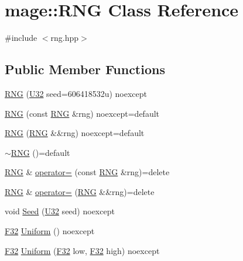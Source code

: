 \hypertarget{classmage_1_1_r_n_g}{}\section{mage\+:\+:R\+NG Class Reference}
\label{classmage_1_1_r_n_g}


{\ttfamily \#include $<$rng.\+hpp$>$}

\subsection*{Public Member Functions}
\begin{DoxyCompactItemize}
\item 
\mbox{\hyperlink{classmage_1_1_r_n_g_aa428fa24cbe52d5819bd6e8d6abd362a}{R\+NG}} (\mbox{\hyperlink{namespacemage_aa5d6eaabaac3cdd01873d6a3d27e90f3}{U32}} seed=606418532u) noexcept
\item 
\mbox{\hyperlink{classmage_1_1_r_n_g_a7a215b676b1192d312393e1bd136eb54}{R\+NG}} (const \mbox{\hyperlink{classmage_1_1_r_n_g}{R\+NG}} \&rng) noexcept=default
\item 
\mbox{\hyperlink{classmage_1_1_r_n_g_a6df36809ab6b982ee21d1987b6e9a693}{R\+NG}} (\mbox{\hyperlink{classmage_1_1_r_n_g}{R\+NG}} \&\&rng) noexcept=default
\item 
\mbox{\hyperlink{classmage_1_1_r_n_g_a20d24aabf31837e48a38b9ca221b0a9b}{$\sim$\+R\+NG}} ()=default
\item 
\mbox{\hyperlink{classmage_1_1_r_n_g}{R\+NG}} \& \mbox{\hyperlink{classmage_1_1_r_n_g_a38a0a4296338162fe105012cb4d13318}{operator=}} (const \mbox{\hyperlink{classmage_1_1_r_n_g}{R\+NG}} \&rng)=delete
\item 
\mbox{\hyperlink{classmage_1_1_r_n_g}{R\+NG}} \& \mbox{\hyperlink{classmage_1_1_r_n_g_ac9155db13a3d4b7f44a4f800085197a2}{operator=}} (\mbox{\hyperlink{classmage_1_1_r_n_g}{R\+NG}} \&\&rng)=delete
\item 
void \mbox{\hyperlink{classmage_1_1_r_n_g_a1d7bc2fd5525a252d4900f5dd4754162}{Seed}} (\mbox{\hyperlink{namespacemage_aa5d6eaabaac3cdd01873d6a3d27e90f3}{U32}} seed) noexcept
\item 
\mbox{\hyperlink{namespacemage_aa97e833b45f06d60a0a9c4fc22ae02c0}{F32}} \mbox{\hyperlink{classmage_1_1_r_n_g_adaedb39747705386b1a55d6fa47ce78c}{Uniform}} () noexcept
\item 
\mbox{\hyperlink{namespacemage_aa97e833b45f06d60a0a9c4fc22ae02c0}{F32}} \mbox{\hyperlink{classmage_1_1_r_n_g_a0c6bd6066ba54d80471d825d0a2b8472}{Uniform}} (\mbox{\hyperlink{namespacemage_aa97e833b45f06d60a0a9c4fc22ae02c0}{F32}} low, \mbox{\hyperlink{namespacemage_aa97e833b45f06d60a0a9c4fc22ae02c0}{F32}} high) noexcept
\end{DoxyCompactItemize}
